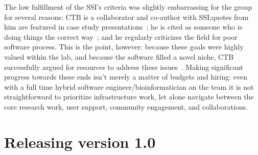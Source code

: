 \documentclass[12pt]{article}
\begin{document}

The low fulfillment of the SSI's criteria was slightly embarrassing for
the group for several reasons: CTB is a collaborator and co-author
with SSI;\@ quotes from him are featured in case study
presentations~\cite{SSI-casestudies}; he is cited as someone who is doing things
the correct way~\cite{SSI-recomputation}; and he regularly criticizes the
field for poor software process.  This is the point, however: because
these goals were highly valued within the lab, and because the
software filled a novel niche, CTB successfully argued for resources
to address these issues~\cite{khmer-future}.  Making significant
progress towards these ends isn't merely a matter of budgets and
hiring: even with a full time hybrid software
engineer/bioinformatician on the team it is not straightforward to
prioritize infrastructure work, let alone navigate between the core
research work, user support, community engagement, and collaborations.





\section{Releasing version 1.0}

\end{document}
